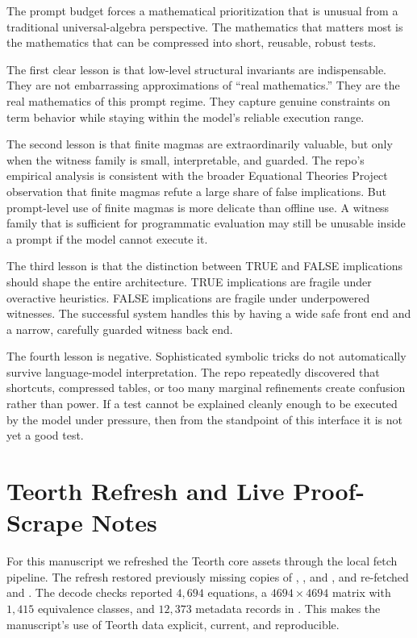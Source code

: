 \documentclass[12pt]{amsart}
\begin{document}
The prompt budget forces a mathematical prioritization that is unusual from a traditional universal-algebra perspective. The mathematics that matters most is the mathematics that can be compressed into short, reusable, robust tests.

The first clear lesson is that low-level structural invariants are indispensable. They are not embarrassing approximations of ``real mathematics.'' They are the real mathematics of this prompt regime. They capture genuine constraints on term behavior while staying within the model's reliable execution range.

The second lesson is that finite magmas are extraordinarily valuable, but only when the witness family is small, interpretable, and guarded. The repo's empirical analysis is consistent with the broader Equational Theories Project observation that finite magmas refute a large share of false implications. But prompt-level use of finite magmas is more delicate than offline use. A witness family that is sufficient for programmatic evaluation may still be unusable inside a prompt if the model cannot execute it.

The third lesson is that the distinction between TRUE and FALSE implications should shape the entire architecture. TRUE implications are fragile under overactive heuristics. FALSE implications are fragile under underpowered witnesses. The successful system handles this by having a wide safe front end and a narrow, carefully guarded witness back end.

The fourth lesson is negative. Sophisticated symbolic tricks do not automatically survive language-model interpretation. The repo repeatedly discovered that shortcuts, compressed tables, or too many marginal refinements create confusion rather than power. If a test cannot be explained cleanly enough to be executed by the model under pressure, then from the standpoint of this interface it is not yet a good test.

\section{Teorth Refresh and Live Proof-Scrape Notes}

For this manuscript we refreshed the Teorth core assets through the local fetch pipeline. The refresh restored previously missing copies of , , and , and re-fetched  and . The decode checks reported $4{,}694$ equations, a $4694 \times 4694$ matrix with $1{,}415$ equivalence classes, and $12{,}373$ metadata records in . This makes the manuscript's use of Teorth data explicit, current, and reproducible.
\end{document}
